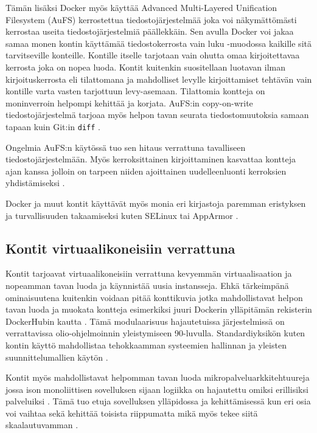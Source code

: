 \documentclass[finnish,gradu]{tktltiki3}
\begin{document}
Tämän lisäksi Docker myös käyttää Advanced Multi-Layered Unification Filesystem (AuFS) kerrostettua tiedostojärjestelmää joka voi näkymättömästi kerrostaa useita tiedostojärjestelmiä päällekkäin. Sen avulla Docker voi jakaa samaa monen kontin käyttämää tiedostokerrosta vain luku -muodossa kaikille sitä tarvitseville konteille. Kontille itselle tarjotaan vain ohutta omaa kirjoitettavaa kerrosta joka on nopea luoda. Kontit kuitenkin suositellaan luotavan ilman kirjoituskerrosta eli tilattomana ja mahdolliset levylle kirjoittamiset tehtävän vain kontille varta vasten tarjottuun levy-asemaan. Tilattomia kontteja on moninverroin helpompi kehittää ja korjata. AuFS:in copy-on-write tiedostojärjestelmä tarjoaa myös helpon tavan seurata tiedostomuutoksia samaan tapaan kuin Git:in \texttt{diff} \cite{docker}.

Ongelmia AuFS:n käytössä tuo sen hitaus verrattuna tavalliseen tiedostojärjestelmään. Myös kerroksittainen kirjoittaminen kasvattaa kontteja ajan kanssa jolloin on tarpeen niiden ajoittainen uudelleenluonti kerroksien yhdistämiseksi \cite{containers-in-multi-user-environments}.

Docker ja muut kontit käyttävät myös monia eri kirjastoja paremman eristyksen ja turvallisuuden takaamiseksi kuten SELinux tai AppArmor \cite{practical-container}.

\subsection{Kontit virtuaalikoneisiin verrattuna}

Kontit tarjoavat virtuaalikoneisiin verrattuna kevyemmän virtuaalisaation ja nopeamman tavan luoda ja käynnistää uusia instansseja. Ehkä tärkeimpänä ominaisuutena kuitenkin voidaan pitää konttikuvia jotka mahdollistavat helpon tavan luoda ja muokata kontteja esimerkiksi juuri Dockerin ylläpitämän rekisterin DockerHubin kautta \cite{docker}. Tämä modulaarisuus hajautetuissa järjestelmissä on verrattavissa olio-ohjelmoinnin yleistymiseen 90-luvulla. Standardiyksikön kuten kontin käyttö mahdollistaa tehokkaamman systeemien hallinnan ja yleisten suunnittelumallien käytön \cite{container-design-patterns}.

Kontit myös mahdollistavat helpomman tavan luoda mikropalveluarkkitehtuureja jossa ison monoliittisen sovelluksen sijaan logiikka on hajautettu omiksi erillisiksi palveluiksi \cite{practical-container, container-design-patterns}. Tämä tuo etuja sovelluksen ylläpidossa ja kehittämisessä kun eri osia voi vaihtaa sekä kehittää toisista riippumatta mikä myös tekee siitä skaalautuvamman \cite{goto-netflix}.
\end{document}
